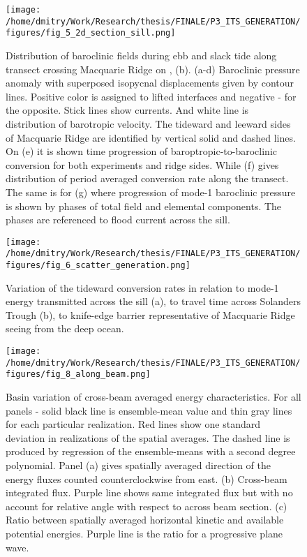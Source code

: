\documentclass[12pt]{article}
\begin{document}
\begin{figure}
	\centering
	\texttt{[image: /home/dmitry/Work/Research/thesis/FINALE/P3\_ITS\_GENERATION/figures/fig\_5\_2d\_section\_sill.png]}
	\caption{Distribution of baroclinic fields during ebb and slack tide along transect crossing 
	Macquarie Ridge on , (b). (a-d) Baroclinic pressure anomaly with superposed 
	isopycnal displacements given by contour lines. Positive color is assigned to lifted interfaces 
	and negative - for the opposite. Stick lines show currents. And white line is distribution 
	of barotropic velocity. The tideward and leeward sides of Macquarie Ridge are identified by 
	vertical solid and dashed lines. On (e) it is shown time progression of 
	baroptropic-to-baroclinic conversion for both experiments and ridge sides. While (f) gives 
	distribution of period averaged conversion rate along the transect. The same is for (g) where 
	progression of mode-1 baroclinic pressure is shown by phases of total field and elemental 
	components. The phases are referenced to flood current across the sill.}
	\label{C3.fig:gen_2d}
\end{figure}

\begin{figure}
	\centering
	\texttt{[image: /home/dmitry/Work/Research/thesis/FINALE/P3\_ITS\_GENERATION/figures/fig\_6\_scatter\_generation.png]}
	\caption{Variation of the tideward conversion rates in relation to mode-1 energy transmitted 
	across the sill (a), to travel time across Solanders Trough (b), to knife-edge barrier 
	representative of Macquarie Ridge seeing from the deep ocean.}
	\label{C3.fig:gen_regr}
\end{figure}

\begin{figure}
	\centering
	\texttt{[image: /home/dmitry/Work/Research/thesis/FINALE/P3\_ITS\_GENERATION/figures/fig\_8\_along\_beam.png]}
	\caption{Basin variation of cross-beam averaged energy characteristics. For all panels - solid 
	black line is ensemble-mean value and thin gray lines for each particular realization. Red 
	lines show one standard deviation in realizations of the spatial averages. The dashed line is 
	produced by regression of the ensemble-means with a second degree polynomial. Panel (a) gives 
	spatially averaged direction of the energy fluxes counted counterclockwise from east. (b) 
	Cross-beam integrated flux. Purple line shows same integrated flux but with no account for 
	relative angle with respect to across beam section. (c) Ratio between spatially averaged 
	horizontal kinetic and available potential energies. Purple line is the ratio for a progressive 
	plane wave.}
	\label{C3.fig:beam_prms}
\end{figure}
\end{document}
